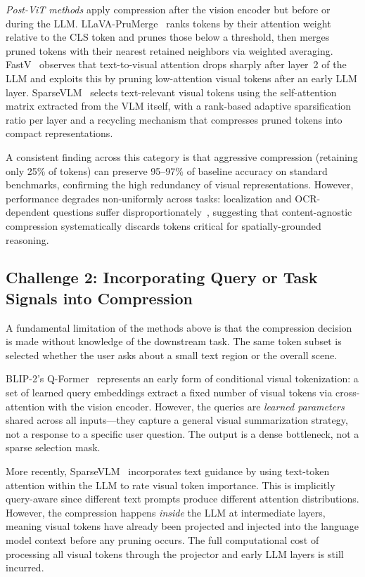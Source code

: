 \documentclass[11pt,twocolumn]{article}
\begin{document}
\emph{Post-ViT methods} apply compression after the vision encoder but before or during the LLM. LLaVA-PruMerge~\cite{shang2024llava} ranks tokens by their attention weight relative to the CLS token and prunes those below a threshold, then merges pruned tokens with their nearest retained neighbors via weighted averaging. FastV~\cite{chen2024fastv} observes that text-to-visual attention drops sharply after layer~2 of the LLM and exploits this by pruning low-attention visual tokens after an early LLM layer. SparseVLM~\cite{zhang2025sparsevlm} selects text-relevant visual tokens using the self-attention matrix extracted from the VLM itself, with a rank-based adaptive sparsification ratio per layer and a recycling mechanism that compresses pruned tokens into compact representations.

A consistent finding across this category is that aggressive compression (retaining only 25\% of tokens) can preserve 95--97\% of baseline accuracy on standard benchmarks, confirming the high redundancy of visual representations. However, performance degrades non-uniformly across tasks: localization and OCR-dependent questions suffer disproportionately~\cite{chen2024fastv}, suggesting that content-agnostic compression systematically discards tokens critical for spatially-grounded reasoning.

\subsection{Challenge 2: Incorporating Query or Task Signals into Compression}

A fundamental limitation of the methods above is that the compression decision is made without knowledge of the downstream task. The same token subset is selected whether the user asks about a small text region or the overall scene.

BLIP-2's Q-Former~\cite{li2023blip2} represents an early form of conditional visual tokenization: a set of learned query embeddings extract a fixed number of visual tokens via cross-attention with the vision encoder. However, the queries are \emph{learned parameters} shared across all inputs---they capture a general visual summarization strategy, not a response to a specific user question. The output is a dense bottleneck, not a sparse selection mask.

More recently, SparseVLM~\cite{zhang2025sparsevlm} incorporates text guidance by using text-token attention within the LLM to rate visual token importance. This is implicitly query-aware since different text prompts produce different attention distributions. However, the compression happens \emph{inside} the LLM at intermediate layers, meaning visual tokens have already been projected and injected into the language model context before any pruning occurs. The full computational cost of processing all visual tokens through the projector and early LLM layers is still incurred.
\end{document}
